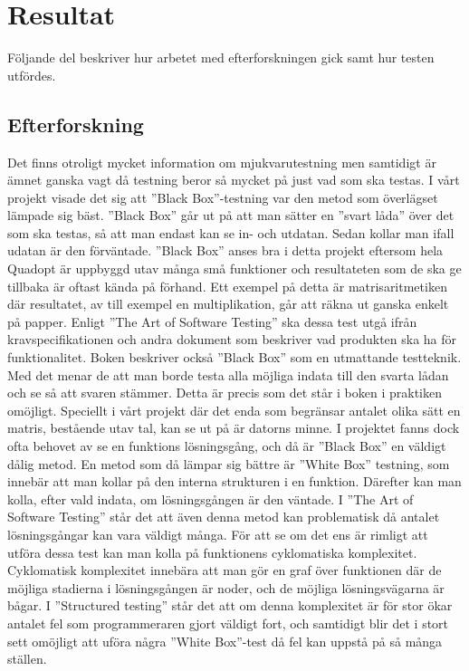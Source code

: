 \section{Resultat}	
	Följande del beskriver hur arbetet med efterforskningen gick samt hur testen utfördes.
	\subsection{Efterforskning}
	Det finns otroligt mycket information om mjukvarutestning men samtidigt är ämnet ganska vagt då testning beror så mycket på just vad som ska testas. I vårt projekt visade det sig att ''Black Box''-testning var den metod som överlägset lämpade sig bäst. ''Black Box'' går ut på att man sätter en ''svart låda'' över det som ska testas, så att man endast kan se in- och utdatan. Sedan kollar man ifall udatan är den förväntade. ''Black Box'' anses bra i detta projekt eftersom hela Quadopt är uppbyggd utav många små funktioner och resultateten som de ska ge tillbaka är oftast kända på förhand. Ett exempel på detta är matrisaritmetiken där resultatet, av till exempel en multiplikation, går att räkna ut ganska enkelt på papper. Enligt ''The Art of Software Testing'' ska dessa test utgå ifrån kravspecifikationen och andra dokument som beskriver vad produkten ska ha för funktionalitet. Boken beskriver också ''Black Box'' som en utmattande testteknik. Med det menar de att man borde testa alla möjliga indata till den svarta lådan och se så att svaren stämmer. Detta är precis som det står i boken i praktiken omöjligt. Speciellt i vårt projekt där det enda som begränsar antalet olika sätt en matris, bestående utav tal, kan se ut på är datorns minne. \newline
I projektet fanns dock ofta behovet av se en funktions lösningsgång, och då är ''Black Box'' en väldigt dålig metod. En metod som då lämpar sig bättre är ''White Box'' testning, som innebär att man kollar på den interna strukturen i en funktion. Därefter kan man kolla, efter vald indata, om lösningsgången är den väntade. I ''The Art of Software Testing'' står det att även denna metod kan problematisk då antalet lösningsgångar kan vara väldigt många. För att se om det ens är rimligt att utföra dessa test kan man kolla på funktionens cyklomatiska komplexitet. Cyklomatisk komplexitet innebära att man gör en graf över funktionen där de möjliga stadierna i lösningsgången är noder, och de möjliga lösningsvägarna är bågar. I ''Structured testing'' \citep{structest} står det att om denna komplexitet är för stor ökar antalet fel som programmeraren gjort väldigt fort, och samtidigt blir det i stort sett omöjligt att uföra några ''White Box''-test då fel kan uppstå på så många ställen. \\ 	
